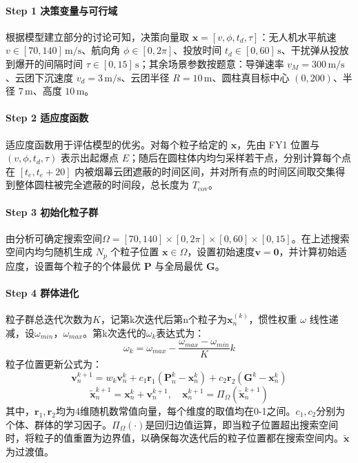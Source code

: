 \documentclass[withoutpreface]{cumcmthesis}
\begin{document}
\paragraph{Step 1 决策变量与可行域}
根据模型建立部分的讨论可知，决策向量取 \( \mathbf{x} = [v, \phi, t_d, \tau] \)：无人机水平航速 \( v \in [70, 140] \, \text{m/s} \)、航向角 \( \phi \in [0, 2\pi] \)、投放时间 \( t_d \in [0, 60] \, \text{s} \)、干扰弹从投放到爆开的间隔时间 \( \tau \in [0, 15] \, \text{s} \)；其余场景参数按题意：导弹速率 \( v_M=300 \, \text{m/s} \)、云团下沉速度 \(v_d= 3 \, \text{m/s} \)、云团半径 \( R=10 \, \text{m} \)、圆柱真目标中心 \( (0, 200) \)、半径 \( 7 \, \text{m} \)、高度 \(10 \, \text{m} \)。

\paragraph{Step 2 适应度函数}
适应度函数用于评估模型的优劣。对每个粒子给定的 \( \mathbf{x} \)，先由 FY1 位置与 \( (v, \phi, t_d, \tau) \) 表示出起爆点 \( E \)；随后在圆柱体内均匀采样若干点，分别计算每个点在 \( [t_e, t_e + 20] \) 内被烟幕云团遮蔽的时间区间，并对所有点的时间区间取交集得到整体圆柱被完全遮蔽的时间段，总长度为 \( T_{\text{cov}} \)。

\paragraph{Step 3 初始化粒子群}
由分析可确定搜索空间$\varOmega=[70,140]\times[0,2\pi]\times[0,60]\times[0,15]$。在上述搜索空间内均匀随机生成 \( N_p \) 个粒子位置 $\mathbf{x}\in \varOmega $，设置初始速度$\mathbf{v}=\mathbf{0}$，并计算初始适应度，设置每个粒子的个体最优 \( \mathbf{P} \) 与全局最优 \( \mathbf{G} \)。


\paragraph{Step 4 群体进化}
粒子群总迭代次数为$K$，记第k次迭代后第n个粒子为$\mathbf{x}_n^{(k)}$，惯性权重 \( \omega  \) 线性递减，设$\omega_{min}$，$\omega_{max}$。第k次迭代的$\omega_{k}$表达式为：
\begin{equation}
    \omega_k=\omega_{max}-\frac{\omega_{max}-\omega_{min}}{K}k
\end{equation}
粒子位置更新公式为：
\begin{equation}
    \mathbf{v}_n^{k+1} = w_k \mathbf{v}_n^k + c_1 \mathbf{r}_1 (\mathbf{P}_n^k - \mathbf{x}_n^k) + c_2 \mathbf{r}_2 (\mathbf{G}^k - \mathbf{x}_n^k)
\end{equation}
\begin{equation}
    \tilde{\mathbf{x}}_n^{k+1} = \mathbf{x}_n^k + \mathbf{v}_n^{k+1}, \quad \mathbf{x}_n^{k+1} = \Pi_\Omega(\tilde{\mathbf{x}}_n^{k+1})
\end{equation}
其中，$\mathbf{r}_1,\mathbf{r}_2$均为4维随机数常值向量，每个维度的取值均在0-1之间。$c_1,c_2$分别为个体、群体的学习因子。$\Pi_\Omega(\cdot)$是回归边值运算，即当粒子位置超出搜索空间时，将粒子的值重置为边界值，以确保每次迭代后的粒子位置都在搜索空间内。\(\tilde{\mathbf{x}}\)为过渡值。
\end{document}
